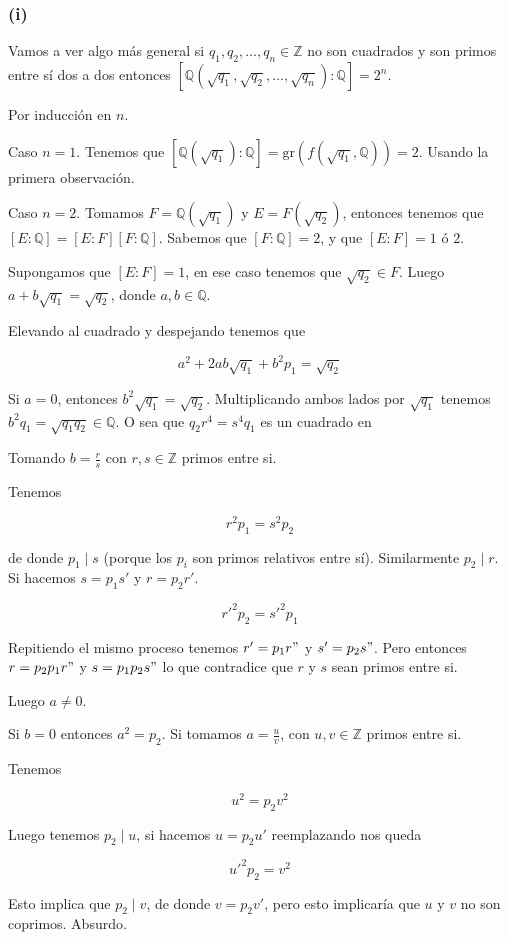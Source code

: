 \documentclass{article}
\def\Q{\mathbb{Q}}
\def\Z{\mathbb{Z}}
\def\q[#1]{\sqrt{q_{#1}}}
\theoremstyle{definition}
\begin{document}
\subsubsection*{(i)}

Vamos a ver algo más general si $q_1,q_2,\dots,q_n \in \Z$ no son cuadrados y
son primos entre sí dos a dos entonces $[\Q(\q[1],\q[2],\dots,\q[n]):\Q] = 2^n $.

Por inducción en $n$.

Caso $n=1$. Tenemos que $[\Q(\q[1]):\Q] = \textrm{gr}(f(\q[1], \Q)) = 2$.
Usando la primera observación.

Caso $n=2$. Tomamos $F = \Q(\q[1])$ y $E = F(\q[2])$, entonces
tenemos que $[E:\Q] = [E:F][F:\Q]$. Sabemos que $[F:\Q] = 2$, y que 
$[E:F] = 1$ ó $2$.

Supongamos que $[E:F] = 1$, en ese caso tenemos que $\q[2] \in F$.
Luego $a + b\q[1] = \q[2]$, donde $a,b \in \Q$.

Elevando al cuadrado y despejando tenemos que 

\[ a^2 + 2ab \q[1] + b^2 p_1 = \q[2] \]

Si $a=0$, entonces $b^2 \q[1] = \q[2]$. Multiplicando ambos lados 
por $\q[1]$ tenemos $b^2 q_1 = \sqrt{q_1 q_2} \in \Q$. O sea que
$q_2 r^4 = s^4 q_1$ es un cuadrado en

Tomando $b = \frac{r}{s}$ 
con $r,s \in \Z$ primos entre si.

Tenemos 

\[ r^2 p_1 = s^2 p_2 \]

de donde $p_1 \mid s$ (porque los $p_i$ son primos relativos entre sí). 
Similarmente $p_2 \mid r$. Si hacemos $s = p_1 s'$ y $r = p_2 r'$.

\[ r'^2 p_2 = s'^2 p_1 \]

Repitiendo el mismo proceso tenemos $r' = p_1 r"$ y $s' = p_2 s"$.
Pero entonces $r = p_2 p_1 r"$ y $s = p_1 p_2 s"$ lo que contradice
que $r$ y $s$ sean primos entre si.

Luego $a \ne 0$.

Si $b = 0$ entonces $a^2 = p_2$. Si tomamos $a = \frac{u}{v}$, con 
$u, v \in \Z$ primos entre si.

Tenemos 

\[ u^2 = p_2 v^2 \]

Luego tenemos $p_2 \mid u$, si hacemos $u = p_2 u'$ reemplazando
nos queda

\[ u'^2 p_2 = v^2 \]

Esto implica que $p_2 \mid v$, de donde $v = p_2 v'$, pero esto
implicaría que $u$ y $v$ no son coprimos. Absurdo.
\end{document}
